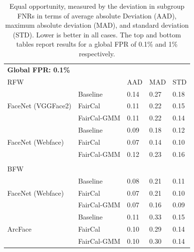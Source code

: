 \begin{table}
\begin{tabular}{l l lll}
\toprule
\textbf{Global FPR: 0.1\%}\\
RFW && AAD & MAD & STD \\
\midrule
\multirow{3}{5em}{FaceNet (VGGFace2)} 
& Baseline    &  0.14  &  0.27  &  0.18  \\
& FairCal     &  0.11  &  0.22  &  0.15  \\
& FairCal-GMM &  0.11  &  0.22  &  0.14  \\
\hline
\multirow{3}{5em}{FaceNet (Webface)} 
& Baseline    &  0.09  &  0.18  &  0.12  \\
& FairCal     &  0.07  &  0.14  &  0.10  \\
& FairCal-GMM &  0.12  &  0.23  &  0.16  \\
\midrule
\\
BFW & & & & \\
\midrule
\multirow{3}{5em}{FaceNet (Webface)} 
& Baseline    &  0.08  &  0.21  &  0.11  \\
& FairCal     &  0.07  &  0.21  &  0.10  \\
& FairCal-GMM &  0.07  &  0.16  &  0.09  \\
\hline
\multirow{3}{5em}{ArcFace} 
& Baseline    &  0.11  &  0.33  &  0.15  \\
& FairCal     &  0.10  &  0.29  &  0.14  \\
& FairCal-GMM &  0.10  &  0.30  &  0.14  \\
\bottomrule
\end{tabular}
\caption{Equal opportunity, measured by the deviation in subgroup FNRs in terms of average absolute Deviation (AAD), maximum absolute deviation (MAD), and standard deviation (STD). Lower is better in all cases. The top and bottom tables report results for a global FPR of 0.1\% and 1\% respectively.}
\label{tab:appEqOpp}
\end{table}


